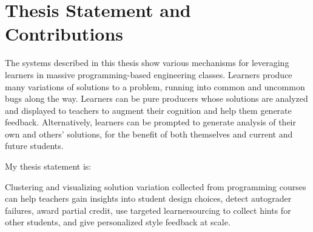 
\section{Thesis Statement and Contributions}

The systems described in this thesis show various mechanisms for leveraging learners in massive programming-based engineering classes. Learners produce many variations of solutions to a problem, running into common and uncommon bugs along the way. Learners can be pure producers whose solutions are analyzed and displayed to teachers to augment their cognition and help them generate feedback. Alternatively, learners can be prompted to generate analysis of their own and others' solutions, for the benefit of both themselves and current and future students. %

My thesis statement is: 
\begin{displayquote}
Clustering and visualizing solution variation collected from programming courses can help teachers gain insights into student design choices, detect autograder failures, award partial credit, use targeted learnersourcing to collect hints for other students, and give personalized style feedback at scale.
\end{displayquote}

